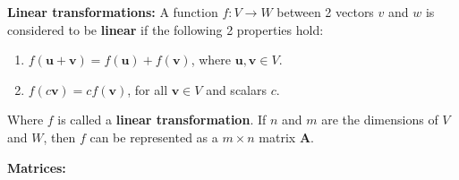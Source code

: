 \documentclass[12pt]{article}
\begin{document}
\newpage
\noindent \textbf{Linear transformations:} A function $f: V \to W$ between 2 vectors $v$ and $w$ is considered to be \textbf{linear} if the following 2 properties hold:
    \begin{enumerate}
        \item $f(\mathbf{u} + \mathbf{v}) = f(\mathbf{u}) + f(\mathbf{v})$, where $\mathbf{u},\mathbf{v} \in V$.
        \item $f(c\mathbf{v}) = cf(\mathbf{v})$, for all $\mathbf{v} \in V$ and scalars $c$.
    \end{enumerate}
    
    Where $f$ is called a \textbf{linear transformation}. If $n$ and $m$ are the dimensions of $V$ and $W$, then $f$ can be represented as a $m \times n$ matrix $\mathbf{A}$.

\medskip
\noindent \textbf{Matrices:}
\end{document}
